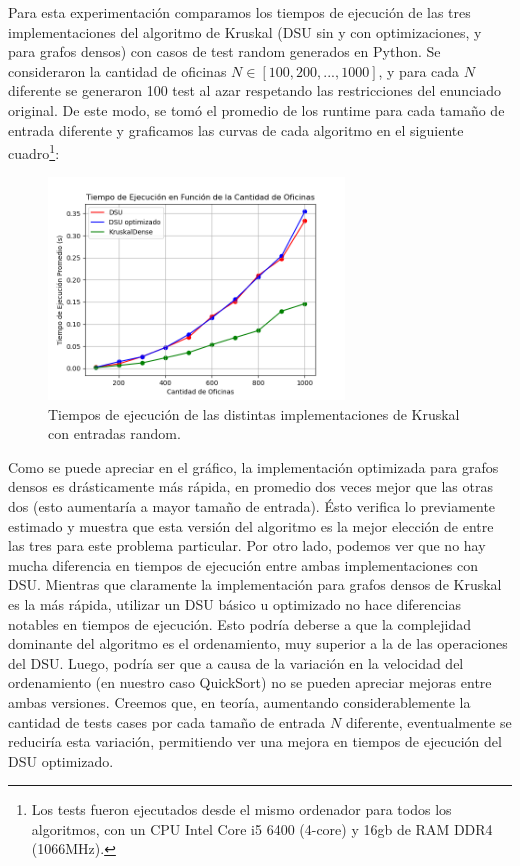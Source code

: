 \vspace{1em}
Para esta experimentación comparamos los tiempos de ejecución de las tres implementaciones del algoritmo de Kruskal (DSU sin y con optimizaciones, y para grafos densos) con casos de test random generados en Python. Se consideraron la cantidad de oficinas $N \in [100, 200,..., 1000]$, y para cada $N$ diferente se generaron 100 test al azar respetando las restricciones del enunciado original. De este modo, se tomó el promedio de los runtime para cada tamaño de entrada diferente y graficamos las curvas de cada algoritmo en el siguiente cuadro\footnote{Los tests fueron ejecutados desde el mismo ordenador para todos los algoritmos, con un CPU Intel Core i5 6400 (4-core) y 16gb de RAM DDR4 (1066MHz).}:

\begin{figure}[h]
    \centering
    \includegraphics[width=0.7\textwidth, trim=0 0 0 10]{./graficoKlinear.png}
    \caption{Tiempos de ejecución de las distintas implementaciones de Kruskal con entradas random.} \label{graficoImplementaciones}
\end{figure}

\vspace{1em}
Como se puede apreciar en el gráfico, la implementación optimizada para grafos densos es drásticamente más rápida, en promedio dos veces mejor que las otras dos (esto aumentaría a mayor tamaño de entrada). Ésto verifica lo previamente estimado y muestra que esta versión del algoritmo es la mejor elección de entre las tres para este problema particular. Por otro lado, podemos ver que no hay mucha diferencia en tiempos de ejecución entre ambas implementaciones con DSU. Mientras que claramente la implementación para grafos densos de Kruskal es la más rápida, utilizar un DSU básico u optimizado no hace diferencias notables en tiempos de ejecución. Esto podría deberse a que la complejidad dominante del algoritmo es el ordenamiento, muy superior a la de las operaciones del DSU. Luego, podría ser que a causa de la variación en la velocidad del ordenamiento (en nuestro caso QuickSort) no se pueden apreciar mejoras entre ambas versiones. Creemos que, en teoría, aumentando considerablemente la cantidad de tests cases por cada tamaño de entrada $N$ diferente, eventualmente se reduciría esta variación, permitiendo ver una mejora en tiempos de ejecución del DSU optimizado. 